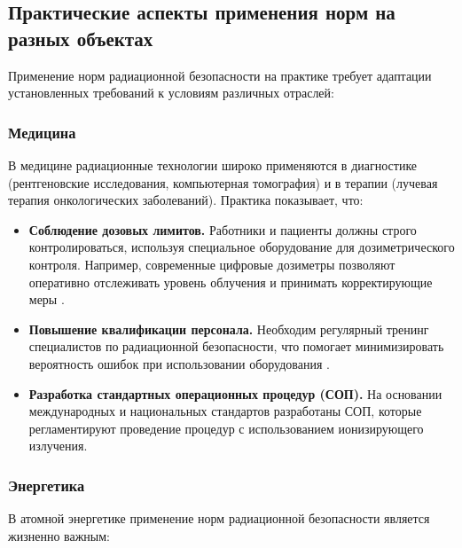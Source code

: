 \documentclass[a4paper, 14pt]{extarticle}
\begin{document}
\subsection{Практические аспекты применения норм на разных объектах}

Применение норм радиационной безопасности на практике требует адаптации установленных требований к условиям различных отраслей:

\subsubsection{Медицина}

В медицине радиационные технологии широко применяются в диагностике (рентгеновские исследования, компьютерная томография) и в терапии (лучевая терапия онкологических заболеваний). Практика показывает, что:

\begin{itemize}
    \item \textbf{Соблюдение дозовых лимитов.} Работники и пациенты должны строго контролироваться, используя специальное оборудование для дозиметрического контроля. Например, современные цифровые дозиметры позволяют оперативно отслеживать уровень облучения и принимать корректирующие меры \cite{14}.

    \item \textbf{Повышение квалификации персонала.} Необходим регулярный тренинг специалистов по радиационной безопасности, что помогает минимизировать вероятность ошибок при использовании оборудования \cite{14}.

    \item \textbf{Разработка стандартных операционных процедур (СОП).} На основании международных и национальных стандартов разработаны СОП, которые регламентируют проведение процедур с использованием ионизирующего излучения.
\end{itemize}

\subsubsection{Энергетика}

В атомной энергетике применение норм радиационной безопасности является жизненно важным:
\end{document}
